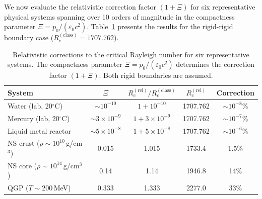We now evaluate the relativistic correction factor $(1+\Xi)$ for six
representative physical systems spanning over 10 orders of magnitude in the
compactness parameter $\Xi = p_0/(\varepsilon_0 c^2)$.
Table~\ref{tab:rel-15-systematic} presents the results for the
rigid-rigid boundary case ($R_c^{(\mathrm{class})} = 1707.762$).

\begin{table}[htbp]
\centering
\caption{Relativistic corrections to the critical Rayleigh number for six
  representative systems.  The compactness parameter
  $\Xi = p_0/(\varepsilon_0 c^2)$ determines the correction factor
  $(1+\Xi)$.  Both rigid boundaries are assumed.}
\label{tab:rel-15-systematic}
\medskip
\begin{tabular}{@{}l c c c c@{}}
\toprule
System & $\Xi$ & $R_c^{(\mathrm{rel})}/R_c^{(\mathrm{class})}$
  & $R_c^{(\mathrm{rel})}$ & Correction \\
\midrule
Water (lab, 20$^\circ$C) & $\sim 10^{-10}$ & $1 + 10^{-10}$ & 1707.762 & $\sim 10^{-8}\%$ \\[3pt]
Mercury (lab, 20$^\circ$C) & $\sim 3\times 10^{-9}$ & $1 + 3\times 10^{-9}$ & 1707.762 & $\sim 10^{-7}\%$ \\[3pt]
Liquid metal reactor & $\sim 5\times 10^{-8}$ & $1 + 5\times 10^{-8}$ & 1707.762 & $\sim 10^{-6}\%$ \\[3pt]
NS crust ($\rho \sim 10^{10}$\,g/cm$^3$) & 0.015 & 1.015 & 1733.4 & 1.5\% \\[3pt]
NS core ($\rho \sim 10^{14}$\,g/cm$^3$) & 0.14 & 1.14 & 1946.8 & 14\% \\[3pt]
QGP ($T \sim 200$\,MeV) & 0.333 & 1.333 & 2277.0 & 33\% \\
\bottomrule
\end{tabular}
\end{table}

